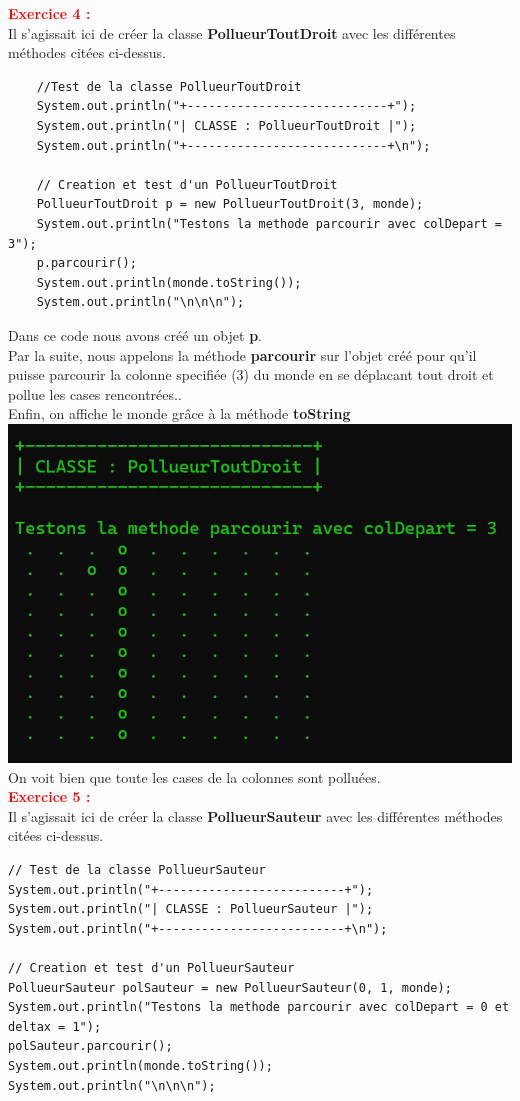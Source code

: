 \documentclass{article}
\begin{document}
\textcolor{red}{\textbf{\Large{Exercice 4 :}}}\\
Il s'agissait ici de créer la classe \textbf{PollueurToutDroit} avec les différentes méthodes citées ci-dessus.\\
\begin{lstlisting}
	//Test de la classe PollueurToutDroit
	System.out.println("+----------------------------+");
	System.out.println("| CLASSE : PollueurToutDroit |");
	System.out.println("+----------------------------+\n");
	
	// Creation et test d'un PollueurToutDroit
	PollueurToutDroit p = new PollueurToutDroit(3, monde);
	System.out.println("Testons la methode parcourir avec colDepart = 3");
	p.parcourir();
	System.out.println(monde.toString());
	System.out.println("\n\n\n");
\end{lstlisting}
Dans ce code nous avons créé un objet \textbf{p}.\\
Par la suite, nous appelons la méthode \textbf{parcourir} sur l'objet créé pour qu'il puisse parcourir la colonne specifiée (3) du monde en se déplacant tout droit et pollue les cases rencontrées..\\
Enfin, on affiche le monde grâce à la méthode \textbf{toString}\\

\includegraphics[scale=0.5]{../images/exo3.png}\\
On voit bien que toute les cases de la colonnes sont polluées.\\

\textcolor{red}{\textbf{\Large{Exercice 5 :}}}\\
Il s'agissait ici de créer la classe \textbf{PollueurSauteur} avec les différentes méthodes citées ci-dessus.\\
\begin{lstlisting}
// Test de la classe PollueurSauteur
System.out.println("+--------------------------+");
System.out.println("| CLASSE : PollueurSauteur |");
System.out.println("+--------------------------+\n");

// Creation et test d'un PollueurSauteur
PollueurSauteur polSauteur = new PollueurSauteur(0, 1, monde);
System.out.println("Testons la methode parcourir avec colDepart = 0 et deltax = 1");
polSauteur.parcourir();
System.out.println(monde.toString());
System.out.println("\n\n\n");
\end{lstlisting}
\end{document}
